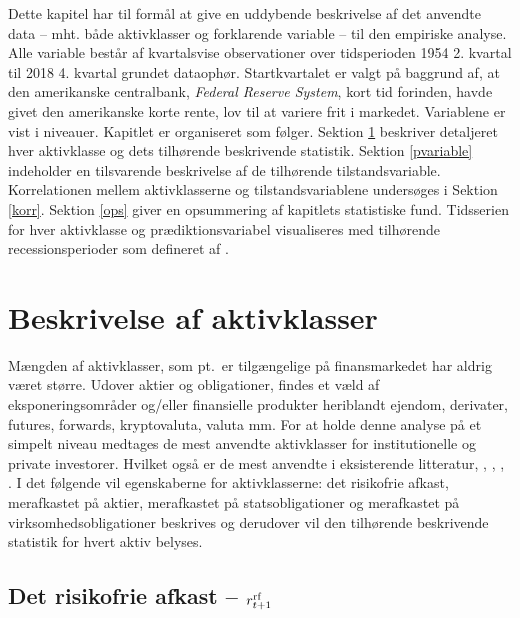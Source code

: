 \documentclass[
  a4paper,
  oneside]{memoir}
\begin{document}
Dette kapitel har til formål at give en uddybende beskrivelse af det anvendte data -- mht. både aktivklasser og forklarende variable -- til den empiriske analyse. Alle variable består af kvartalsvise observationer over tidsperioden 1954 2. kvartal til 2018 4. kvartal grundet dataophør. Startkvartalet er valgt på baggrund af, at den amerikanske centralbank, \emph{Federal Reserve System}, kort tid forinden, havde givet den amerikanske korte rente, lov til at variere frit i markedet. Variablene er vist i niveauer. Kapitlet er organiseret som følger. Sektion \ref{aktivklasser} beskriver detaljeret hver aktivklasse og dets tilhørende beskrivende statistik. Sektion \ref{pvariable} indeholder en tilsvarende beskrivelse af de tilhørende tilstandsvariable. Korrelationen mellem aktivklasserne og tilstandsvariablene undersøges i Sektion \ref{korr}. Sektion \ref{ops} giver en opsummering af kapitlets statistiske fund. Tidsserien for hver aktivklasse og prædiktionsvariabel visualiseres med tilhørende recessionsperioder som defineret af \citep{NBER2020}.

\hypertarget{aktivklasser}{%
\section{Beskrivelse af aktivklasser}\label{aktivklasser}}

Mængden af aktivklasser, som pt.~er tilgængelige på finansmarkedet har aldrig været større. Udover aktier og obligationer, findes et væld af eksponeringsområder og/eller finansielle produkter heriblandt ejendom, derivater, futures, forwards, kryptovaluta, valuta mm. For at holde denne analyse på et simpelt niveau medtages de mest anvendte aktivklasser for institutionelle og private investorer. Hvilket også er de mest anvendte i eksisterende litteratur, \citep{CampVic2003, CampVic1999}, \citep{JurVic2011}, \citep{Engsted2012}, \citep{CampVicCha2003}. I det følgende vil egenskaberne for aktivklasserne: det risikofrie afkast, merafkastet på aktier, merafkastet på statsobligationer og merafkastet på virksomhedsobligationer beskrives og derudover vil den tilhørende beskrivende statistik for hvert aktiv belyses.

\hypertarget{det-risikofrie-afkast-r_t1textnormalrf}{%
\subsection{\texorpdfstring{Det risikofrie afkast -- \(r_{t+1}^{\textnormal{rf}}\)}{Det risikofrie afkast -- r\_\{t+1\}\^{}\{\textbackslash textnormal\{rf\}\}}}\label{det-risikofrie-afkast-r_t1textnormalrf}}
\end{document}
